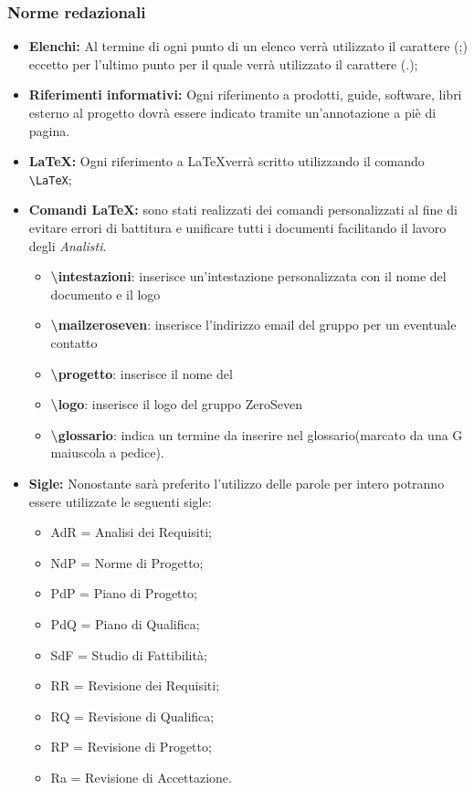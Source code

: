 \subsubsection{Norme redazionali} 

\begin{itemize}
	\item \textbf{Elenchi:} Al termine di ogni punto di un elenco verrà utilizzato il carattere (;) eccetto per l'ultimo punto per il quale verrà utilizzato il carattere (.);
	\item \textbf{Riferimenti informativi:} Ogni riferimento a prodotti, guide, software,
	libri esterno al progetto dovrà essere indicato tramite un’annotazione a piè di
	pagina.
	\item \textbf{\LaTeX:} Ogni riferimento a \LaTeX  verrà scritto utilizzando il comando \texttt{\textbackslash LaTeX};
	\item \textbf{Comandi \LaTeX:} sono stati realizzati dei comandi personalizzati al fine di evitare errori di battitura e unificare tutti i documenti facilitando il lavoro degli \textit{Analisti}.
	\begin{itemize}
		\item \textbf{ \textbackslash intestazioni}: inserisce un'intestazione personalizzata con il nome del documento e il logo
		\item \textbf{ \textbackslash mailzeroseven}: inserisce l'indirizzo email del gruppo per un eventuale contatto
		\item \textbf{ \textbackslash progetto}: inserisce il nome del
		\item \textbf{ \textbackslash logo}: inserisce il logo del gruppo ZeroSeven
		\item \textbf{ \textbackslash glossario}: indica un termine da inserire nel glossario(marcato da una G maiuscola a pedice).	
	\end{itemize}
	
	\item \textbf{Sigle:} Nonostante sarà preferito l'utilizzo delle parole per intero potranno essere utilizzate le seguenti sigle:
	\begin{itemize}
	\item AdR = Analisi dei Requisiti;
	\item NdP = Norme di Progetto;
	\item PdP = Piano di Progetto;
	\item PdQ = Piano di Qualifica;
	\item SdF = Studio di Fattibilità;
	\item RR = Revisione dei Requisiti;
	\item RQ = Revisione di Qualifica;
	\item RP = Revisione di Progetto;
	\item Ra = Revisione di Accettazione.
	\end{itemize}
\end{itemize}
